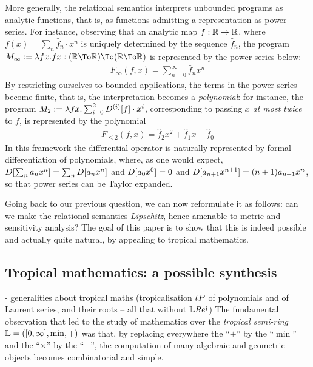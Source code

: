 More generally, the relational semantics interprets unbounded programs as analytic functions, that is, as functions admitting a representation as power series. For instance, observing that an analytic map $f: \mathbb{R}\to \mathbb{R}$, where $f(x)=\sum_{n}\widehat f_{n}\cdot x^{n}$ is uniquely determined by the sequence $\widehat f_{n}$, the program $M_{\infty}:=\lambda fx.fx: (\BB R\To \BB R)\To (\BB R\To \BB R)$ is represented by the power series below:
\begin{align}
F_{\infty}(f,x)= \sum_{n=0}^{\infty} \widehat f_{n} x^{n}
\end{align}
By restricting ourselves to bounded applications, the terms in the power series become finite, that is, the interpretation becomes a \emph{polynomial}: for instance, the program $M_{2}:=\lambda fx. \sum_{i=0}^{2}\Der^{(i)}[f]\cdot x^{i}$, corresponding to passing $x$ \emph{at most twice} to $f$, is represented by the polynomial
\begin{align}
F_{\leq 2}(f,x)=\widehat f_{2} x^{2}  + \widehat f_{1}x +  \widehat f_{0} 
\end{align}
 In this framework the differential operator is naturally represented by formal differentiation of polynomials, where, as one would expect, 
 $\Der[\sum_{n}a_{n}x^{n}]=\sum_{n}\Der[a_{n}x^{n}]$ and $\Der[a_{0}x^{0}]=0$ and $\Der[a_{n+1}x^{n+1}]= (n+1)a_{n+1}x^{n}$, so that power series can be Taylor expanded. 
 
Going back to our previous question, we can now reformulate it as follows: can we make the relational semantics \emph{Lipschitz}, hence amenable to metric and sensitivity analysis? The goal of this paper is to show that this is indeed possible and actually quite natural, by appealing to tropical mathematics.
 
\subsection{Tropical mathematics: a possible synthesis}

- generalities about tropical maths (tropicalisation $\trop P$  of polynomials and of Laurent series, and their roots -- all that without $\LREL$)
The fundamental observation that led to the study of mathematics over the \emph{tropical semi-ring} $\mathbb{L}=([0,\infty],\min,+)$ was that, by replacing everywhere the ``$+$'' by the ``$\min$'' and the ``$\times$'' by the ``$+$'', the computation of many algebraic and geometric objects becomes combinatorial and simple. 


